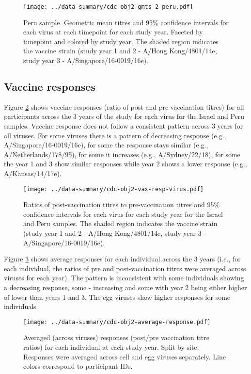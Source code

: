 \documentclass[12pt]{article}
\begin{document}
\begin{figure}
	\texttt{[image: ../data-summary/cdc-obj2-gmts-2-peru.pdf]}
	\caption{Peru sample. Geometric mean titres and 95\% confidence intervals for each virus at each timepoint for each study year. Faceted by timepoint and colored by study year. The shaded region indicates the vaccine strain (study year 1 and 2 - A/Hong Kong/4801/14e, study year 3 - A/Singapore/16-0019/16e).}
	\label{fig:cdc-obj2-gmts-2-peru}
\end{figure}

\subsection{Vaccine responses}

Figure \ref{fig:cdc-obj2-vax-resp-virus} shows vaccine responses (ratio of post and pre vaccination titres)
for all participants across the 3 years of the study for each virus for the Israel and Peru samples. Vaccine
response does not follow a consistent pattern across 3 years for all viruses. For some viruses
there is a pattern of decreasing response (e.g., A/Singapore/16-0019/16e), for some the response stays similar (e.g., A/Netherlands/178/95), for some it increases
(e.g., A/Sydney/22/18), for some the year 1 and 3 show similar responses while
year 2 shows a lower response (e.g., A/Kansas/14/17e).

\begin{figure}
	\texttt{[image: ../data-summary/cdc-obj2-vax-resp-virus.pdf]}
	\caption{Ratios of post-vaccination titres to pre-vaccination titres and 95\% confidence intervals for each virus for each study year for the Israel and Peru samples. The shaded region indicates the vaccine strain (study year 1 and 2 - A/Hong Kong/4801/14e, study year 3 - A/Singapore/16-0019/16e).}
	\label{fig:cdc-obj2-vax-resp-virus}
\end{figure}

Figure \ref{fig:cdc-obj2-average-response} shows average responses for each individual across the 3 years (i.e., for each individual, the ratios of pre and post-vaccination titres were averaged across viruses for each year).
The pattern is inconsistent with some individuals showing a decreasing response,
some - increasing and some with year 2 being either higher of lower
than years 1 and 3.
The egg viruses show higher responses for some individuals.

\begin{figure}
	\texttt{[image: ../data-summary/cdc-obj2-average-response.pdf]}
	\caption{Averaged (across viruses) responses (post/pre vaccination titre ratios) for each individual at each study year. Split by site. Responses were averaged across cell and egg viruses separately. Line colors correspond to participant IDs.}
	\label{fig:cdc-obj2-average-response}
\end{figure}
\end{document}
